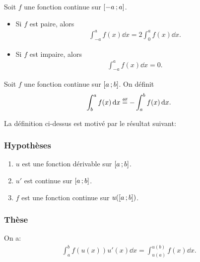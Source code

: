 \documentclass[main.tex]{subfiles}
\begin{document}
\begin{proposition}

    Soit $f$ une fonction continue sur $\mathopen{[}-a\,;a\mathclose{]}$.
    \begin{itemize}
        \item Si $f$ est paire, alors
            \begin{align}
                \int_{-a}^a f(x) \dd x = 2 \int_0^a f(x) \dd x.
            \end{align}
            \begin{plot}{0.5}{-6}{-1}{6}{5}
            \end{plot}
        \item Si $f$ est impaire, alors
            \begin{align}
                \int_{-a}^a f(x) \dd x = 0.
            \end{align}
            \begin{plot}{0.5}{-6}{-5}{6}{5}
            \end{plot}
    \end{itemize}
\end{proposition}

\begin{definition}

    Soit $f$ une fonction continue sur $\mathopen{[}a\,;b\mathclose{]}$.
    On définit
    \begin{align}
        \int_b^a f(x) \dd x \defeq -\int_a^b f(x) \dd x.
    \end{align}
\end{definition}

La définition ci-dessus est motivé par le résultat suivant:

\begin{theorem}

    \subsubsection{Hypothèses}
    \begin{enumerate}
        \item $u$ est une fonction dérivable sur $\mathopen{[}a\,;b\mathclose{]}$.
        \item $u'$ est continue sur $\mathopen{[}a\,;b\mathclose{]}$.
        \item $f$ est une fonction continue sur $u(\mathopen{[}a\,;b\mathclose{]})$.
    \end{enumerate}

    \subsubsection{Thèse}
    On a:
    \begin{align}
        \int_a^b f(u(x)) u'(x) \dd x = \int_{u(a)}^{u(b)} f(x) \dd x.
    \end{align}
\end{theorem}
\end{document}
